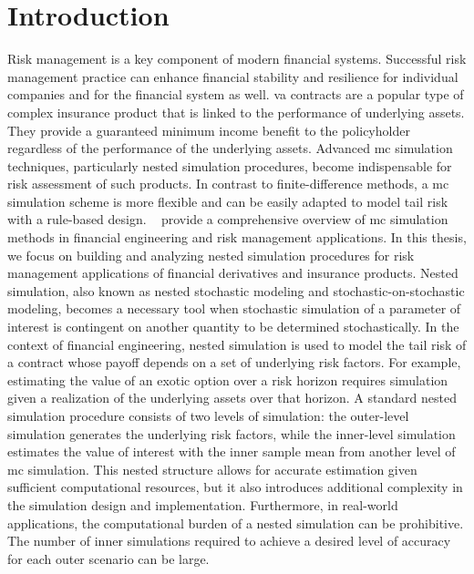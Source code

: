 \chapter{Introduction}

Risk management is a key component of modern financial systems.
Successful risk management practice can enhance financial stability and resilience for individual companies and for the financial system as well.
\gls{va} contracts are a popular type of complex insurance product that is linked to the performance of underlying assets.
They provide a guaranteed minimum income benefit to the policyholder regardless of the performance of the underlying assets.
Advanced \gls{mc} simulation techniques, particularly nested simulation procedures, become indispensable for risk assessment of such products.
In contrast to finite-difference methods, a \gls{mc} simulation scheme is more flexible and can be easily adapted to model tail risk with a rule-based design. ~\cite{glasserman2004monte} provide a comprehensive overview of \gls{mc} simulation methods in financial engineering and risk management applications.
In this thesis, we focus on building and analyzing nested simulation procedures for risk management applications of financial derivatives and insurance products.
Nested simulation, also known as nested stochastic modeling and stochastic-on-stochastic modeling, becomes a necessary tool when stochastic simulation of a parameter of interest is contingent on another quantity to be determined stochastically.
In the context of financial engineering, nested simulation is used to model the tail risk of a contract whose payoff depends on a set of underlying risk factors.
For example, estimating the value of an exotic option over a risk horizon requires simulation given a realization of the underlying assets over that horizon.
A standard nested simulation procedure consists of two levels of simulation: the outer-level simulation generates the underlying risk factors, while the inner-level simulation estimates the value of interest with the inner sample mean from another level of \gls{mc} simulation.
This nested structure allows for accurate estimation given sufficient computational resources, but it also introduces additional complexity in the simulation design and implementation.
Furthermore, in real-world applications, the computational burden of a nested simulation can be prohibitive.
The number of inner simulations required to achieve a desired level of accuracy for each outer scenario can be large.
